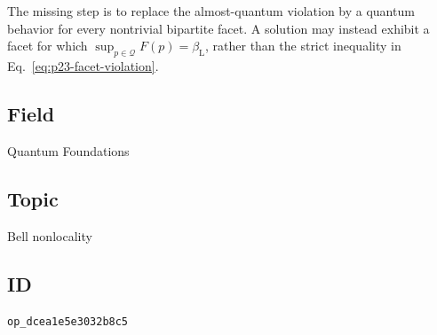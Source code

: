 The missing step is to replace the almost-quantum violation by a quantum
behavior for every nontrivial bipartite facet.  A solution may instead exhibit
a facet for which
$\sup_{p\in\mathcal Q}F(p)=\beta_{\mathrm L}$, rather than the strict
inequality in Eq.~\eqref{eq:p23-facet-violation}.

\subsection*{Field}

Quantum Foundations

\subsection*{Topic}

Bell nonlocality

\subsection*{ID}

\texttt{op\_dcea1e5e3032b8c5}
